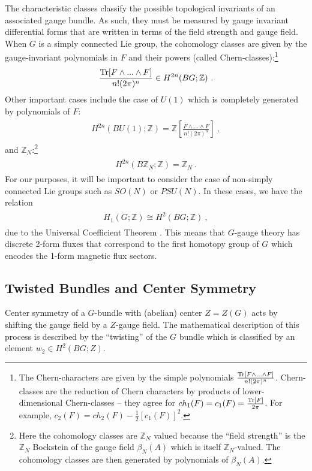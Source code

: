\documentclass[11pt]{article}
\newcommand{\eq}[1]{\begin{align}\begin{split}#1\end{split}\end{align}}
\def\Tr{{\rm Tr}}
\def\IZ{{\mathbb{Z}}}
\begin{document}
The characteristic classes classify the possible topological invariants of an associated gauge bundle. As such, they must be measured by gauge invariant differential forms that are written in terms of the field strength and gauge field. When $G$ is a simply connected Lie group, the cohomology classes are given by the gauge-invariant polynomials in $F$ and their powers (called Chern-classes):\footnote{The Chern-characters are given by the simple polynomials $\frac{\Tr[F\wedge...\wedge F]}{n!(2\pi)^n}$. Chern-classes are the reduction of Chern characters by products of lower-dimensional Chern-classes -- they agree for $ch_1(F)=c_1(F)=\frac{\Tr[F]}{2\pi}$. For example, $c_2 (F) = ch_2(F) - \frac{1}{2} \left[ c_1(F) \right]^2$.}
\eq{
\frac{\Tr[F\wedge...\wedge F]}{n!(2\pi)^n}\in H^{2n}(BG;\IZ)~. 
}
Other important cases include the case of $U(1)$ which is completely generated by polynomials of $F$: 
\eq{
H^{2n}(BU(1);\IZ)=\IZ\left[\frac{F\wedge...\wedge F}{n!(2\pi)^n}\right]~,
}
and $\IZ_N$:\footnote{Here the cohomology classes are $\IZ_N$ valued because the ``field strength'' is the $\IZ_N$ Bockstein of the gauge field $\beta_N(A)$ which is itself $\IZ_N$-valued. The cohomology classes are then generated by polynomials of $\beta_N(A)$. }
\eq{
H^{2n}(B\IZ_N;\IZ)=\IZ_N~. 
}
For our purposes, it will be important to consider the case of non-simply connected Lie groups such as $SO(N)$ or $PSU(N)$. In these cases, we have the relation  
\eq{
H_1(G;\IZ)\cong H^2(BG;\IZ)~,
}
due to the Universal Coefficient Theorem \cite{Hatcher}. This means that $G$-gauge theory has discrete 2-form fluxes that correspond to the first homotopy group of $G$ which encodes the 1-form magnetic flux sectors. 
 

\subsection{Twisted Bundles and Center Symmetry} 
\label{app:twisted_bundle}

Center symmetry of a $G$-bundle with (abelian) center $Z=Z(G)$ acts by shifting the gauge field by a $Z$-gauge field. The mathematical description of this process is described by the ``twisting'' of the $G$ bundle which is classified by an element $w_2\in H^2(BG;Z)$. 
\end{document}
